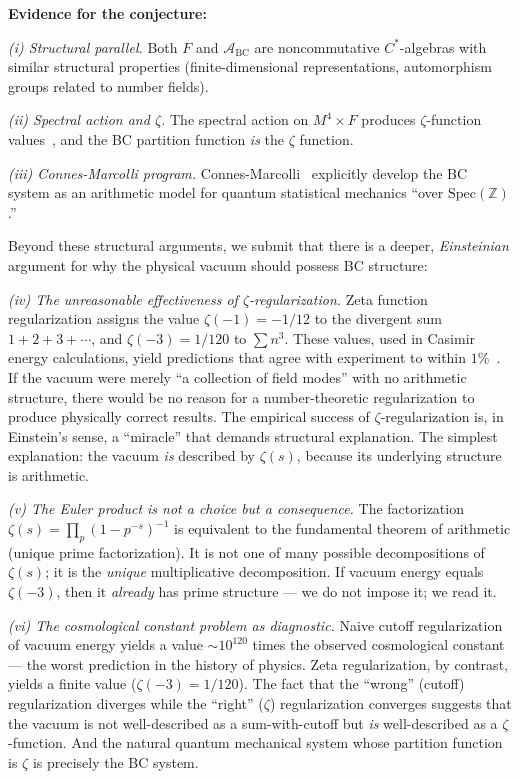 \documentclass[aps,prd,twocolumn,superscriptaddress,nofootinbib]{revtex4-2}
\newcommand{\Spec}{\mathrm{Spec}}
\begin{document}
\textbf{Evidence for the conjecture:}

\textit{(i) Structural parallel.}
Both $F$ and $\mathcal{A}_{\mathrm{BC}}$ are
noncommutative $C^*$-algebras with similar structural
properties (finite-dimensional representations,
automorphism groups related to number fields).

\textit{(ii) Spectral action and $\zeta$.}
The spectral action on $M^4 \times F$ produces
$\zeta$-function values~\cite{CCM2007}, and the BC
partition function \emph{is} the $\zeta$ function.

\textit{(iii) Connes-Marcolli program.}
Connes-Marcolli~\cite{ConnesMarcolli2006} explicitly
develop the BC system as an arithmetic model for quantum
statistical mechanics ``over $\Spec(\mathbb{Z})$.''

Beyond these structural arguments, we submit that there is
a deeper, \emph{Einsteinian} argument for why the physical
vacuum should possess BC structure:

\textit{(iv) The unreasonable effectiveness of $\zeta$-regularization.}
Zeta function regularization assigns the value
$\zeta(-1) = -1/12$ to the divergent sum $1+2+3+\cdots$,
and $\zeta(-3) = 1/120$ to $\sum n^3$.
These values, used in Casimir energy calculations, yield
predictions that agree with experiment to within
$1\%$~\cite{Lamoreaux1997}.
If the vacuum were merely ``a collection of field modes''
with no arithmetic structure, there would be no reason for
a number-theoretic regularization to produce physically
correct results. The empirical success of $\zeta$-regularization
is, in Einstein's sense, a ``miracle'' that demands structural
explanation. The simplest explanation: the vacuum \emph{is}
described by $\zeta(s)$, because its underlying structure
is arithmetic.

\textit{(v) The Euler product is not a choice but a consequence.}
The factorization $\zeta(s) = \prod_p (1-p^{-s})^{-1}$
is equivalent to the fundamental theorem of arithmetic
(unique prime factorization). It is not one of many possible
decompositions of $\zeta(s)$; it is the \emph{unique}
multiplicative decomposition. If vacuum energy equals $\zeta(-3)$,
then it \emph{already} has prime structure --- we do not impose
it; we read it.

\textit{(vi) The cosmological constant problem as diagnostic.}
Naive cutoff regularization of vacuum energy yields a value
$\sim 10^{120}$ times the observed cosmological constant ---
the worst prediction in the history of physics.
Zeta regularization, by contrast, yields a finite value
($\zeta(-3) = 1/120$). The fact that the ``wrong'' (cutoff)
regularization diverges while the ``right'' ($\zeta$)
regularization converges suggests that the vacuum is not
well-described as a sum-with-cutoff but \emph{is}
well-described as a $\zeta$-function. And the natural quantum
mechanical system whose partition function is $\zeta$ is
precisely the BC system.
\end{document}
